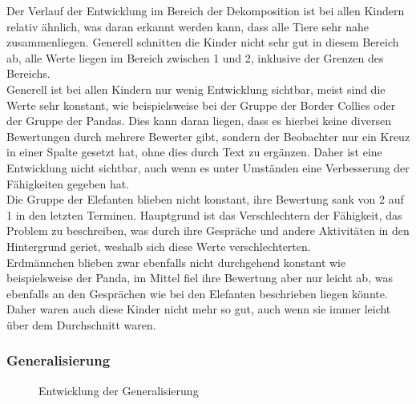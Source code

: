 Der Verlauf der Entwicklung im Bereich der Dekomposition ist bei allen Kindern relativ ähnlich, was daran erkannt werden kann, dass alle Tiere sehr nahe zusammenliegen. Generell schnitten die Kinder nicht sehr gut in diesem Bereich ab, alle Werte liegen im Bereich zwischen 1 und 2, inklusive der Grenzen des Bereichs.\\
Generell ist bei allen Kindern nur wenig Entwicklung sichtbar, meist sind die Werte sehr konstant, wie beispielsweise bei der Gruppe der Border Collies oder der Gruppe der Pandas. Dies kann daran liegen, dass es hierbei keine diversen Bewertungen durch mehrere Bewerter gibt, sondern der Beobachter nur ein Kreuz in einer Spalte gesetzt hat, ohne dies durch Text zu ergänzen. Daher ist eine Entwicklung nicht sichtbar, auch wenn es unter Umständen eine Verbesserung der Fähigkeiten gegeben hat.\\
Die Gruppe der Elefanten blieben nicht konstant, ihre Bewertung sank von 2 auf 1 in den letzten Terminen. Hauptgrund ist das Verschlechtern der Fähigkeit, das Problem zu beschreiben, was durch ihre Gespräche und andere Aktivitäten in den Hintergrund geriet, weshalb sich diese Werte verschlechterten.\\
Erdmännchen blieben zwar ebenfalls nicht durchgehend konstant wie beispielsweise der Panda, im Mittel fiel ihre Bewertung aber nur leicht ab, was ebenfalls an den Gesprächen wie bei den Elefanten beschrieben liegen könnte. Daher waren auch diese Kinder nicht mehr so gut, auch wenn sie immer leicht über dem Durchschnitt waren.

\subsubsection{Generalisierung}
\begin{figure}[H]
	\centering
	\caption{Entwicklung der Generalisierung}
	\label{img:developmentGeneralization}
\end{figure}

